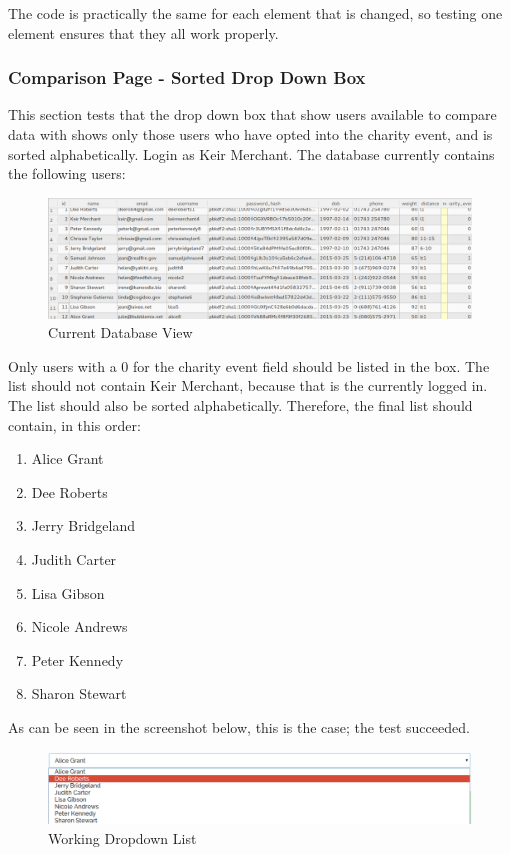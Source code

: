 \documentclass{article}[12pt,a4paper]
\begin{document}
{\clearpage

The code is practically the same for each element that is changed, so testing one element ensures that they all work properly.

\subsubsection{Comparison Page - Sorted Drop Down Box}
This section tests that the drop down box that show users available to compare data with shows only those users who have opted into the charity event, and is sorted alphabetically. Login as Keir Merchant. The database currently contains the following users:

\begin{figure}[h!]
    \includegraphics[scale=0.31]{images/testing/compare_performance/database}
    \caption{Current Database View}
\end{figure}

Only users with a 0 for the charity event field should be listed in the box. The list should not contain Keir Merchant, because that is the currently logged in. The list should also be sorted alphabetically. Therefore, the final list should contain, in this order:

\begin{enumerate}
  \item Alice Grant
  \item Dee Roberts
  \item Jerry Bridgeland
  \item Judith Carter
  \item Lisa Gibson
  \item Nicole Andrews
  \item Peter Kennedy
  \item Sharon Stewart
\end{enumerate}

As can be seen in the screenshot below, this is the case; the test succeeded.

\clearpage

\begin{figure}[h!]
    \includegraphics[scale=0.35]{images/testing/compare_performance/user_list}
    \caption{Working Dropdown List}
\end{figure}

}
\end{document}
